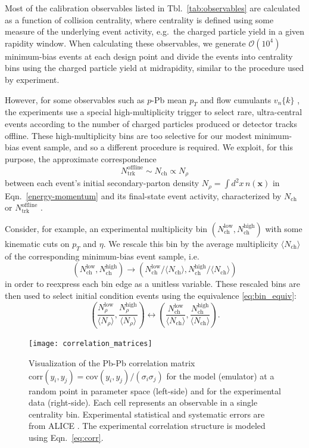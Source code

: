 \documentclass[aps,prc,reprint,amsmath,nofootinbib]{revtex4-1}
\newcommand{\nch}{N_\text{ch}}
\newcommand{\ntrk}{N_\text{trk}^\text{offline}}
\newcommand{\x}{\mathbf{x}}
\newcommand{\vnk}[2]{v_#1\{#2\}}
\newcommand{\order}[1]{$\mathcal O(10^{#1})$}
\begin{document}
Most of the calibration observables listed in Tbl.~\ref{tab:observables} are calculated as a function of collision centrality, where centrality is defined using some measure of the underlying event activity, e.g.\ the charged particle yield in a given rapidity window.
When calculating these observables, we generate \order{4} minimum-bias events at each design point and divide the events into centrality bins using the charged particle yield at midrapidity, similar to the procedure used by experiment.

However, for some observables such as $p$-Pb mean $p_T$ \cite{Abelev:2013bla} and flow cumulants $\vnk{n}{k}$ \cite{Chatrchyan:2013nka}, the experiments use a special high-multiplicity trigger to select rare, ultra-central events according to the number of charged particles produced or detector tracks offline.
These high-multiplicity bins are too selective for our modest minimum-bias event sample, and so a different procedure is required.
We exploit, for this purpose, the approximate correspondence
\begin{equation}
  \label{eq:bin_equiv}
  \ntrk \sim \nch \propto N_\rho
\end{equation}
between each event's initial secondary-parton density ${N_\rho = \int d^2x\,n(\x)}$ in Eqn.~\eqref{energy-momentum} and its final-state event activity, characterized by $\nch$ or $\ntrk$ \cite{Abelev:2013bla, Chatrchyan:2013nka}.

Consider, for example, an experimental multiplicity bin $(\nch^\text{low}, \nch^\text{high})$ with some kinematic cuts on $p_T$ and $\eta$.
We rescale this bin by the average multiplicity $\langle \nch \rangle$ of the corresponding minimum-bias event sample, i.e.\
\begin{equation}
  (\nch^\text{low}, \nch^\text{high}) \rightarrow (\nch^\text{low} / \langle \nch \rangle, \nch^\text{high} / \langle \nch \rangle)
\end{equation}
in order to reexpress each bin edge as a unitless variable.
These rescaled bins are then used to select initial condition events using the equivalence \eqref{eq:bin_equiv}:
\begin{equation}
  \label{eq:mult_trigger}
  \left (\frac{N^\text{low}_\rho}{\langle N_\rho \rangle}, \frac{N^\text{high}_\rho}{\langle N_\rho \rangle} \right) \leftrightarrow \left (\frac{\nch^\text{low}}{\langle \nch \rangle}, \frac{\nch^\text{high}}{\langle \nch \rangle} \right ).
\end{equation}

\begin{figure}[t]
  \texttt{[image: correlation\_matrices]}
  \caption{Visualization of the Pb-Pb correlation matrix $\mathrm{corr}(y_i, y_j) = \mathrm{cov}(y_i,y_j)/(\sigma_i \sigma_j)$ for the model (emulator) at a random point in parameter space (left-side) and for the experimental data (right-side). Each cell represents an observable in a single centrality bin. Experimental statistical and systematic errors are from ALICE \cite{Adam:2015ptt, Adam:2016izf}. The experimental correlation structure is modeled using Eqn.~\eqref{eq:corr}.}
  \label{fig:correlation}
\end{figure}
\end{document}
